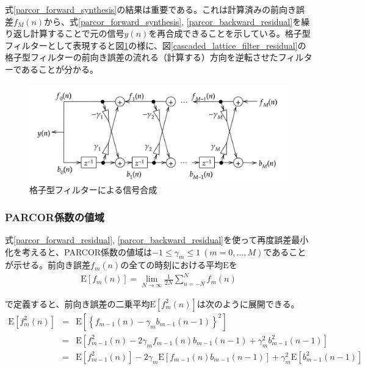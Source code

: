 \documentclass[uplatex,dvipdfmx,b5j,10pt]{jsbook}
\theoremstyle{definition}
\begin{document}
式\ref{parcor_forward_synthesis}の結果は重要である。これは計算済みの前向き誤差$f_{M}(n)$から、式\ref{parcor_forward_synthesis}, \ref{parcor_backward_residual}を繰り返し計算することで元の信号$y(n)$を再合成できることを示している。格子型フィルターとして表現すると図\ref{cascaded_lattice_filter_synthesis}の様に、図\ref{cascaded_lattice_filter_residual}の格子型フィルターの前向き誤差の流れる（計算する）方向を逆転させたフィルターであることが分かる。
\begin{figure}[htbp]
  \begin{center}
    \includegraphics[width=120mm]{./figs/cascaded_lattice_filter_synthesis.png}
    \caption{格子型フィルターによる信号合成} \label{cascaded_lattice_filter_synthesis}
  \end{center}
\end{figure}

\subsubsection{PARCOR係数の値域} \label{range_of_parcor_coef}

式\ref{parcor_forward_residual}, \ref{parcor_backward_residual}を使って再度誤差最小化を考えると、PARCOR係数の値域は$-1 \leq \gamma_{m} \leq 1\ (m=0,\dots,M)$であることが示せる。前向き誤差$f_{m}(n)$の全ての時刻における平均$\textrm{E}$を
\begin{eqnarray*}
  \textrm{E}[f_{m}(n)] = \lim_{N \to \infty}\frac{1}{2N} \sum_{n = -N}^{N} f_{m}(n)
\end{eqnarray*}

で定義すると、前向き誤差の二乗平均$\textrm{E}[f_{m}^{2}(n)]$は次のように展開できる。
\begin{eqnarray*}
  \textrm{E}[f_{m}^{2}(n)] &=& \textrm{E}\left[ \left\{ f_{m-1}(n) - \gamma_{m} b_{m-1}(n - 1) \right\}^{2} \right] \\
  &=& \textrm{E}\left[ f_{m-1}^{2}(n) - 2 \gamma_{m} f_{m-1}(n)b_{m-1}(n - 1) + \gamma_{m}^{2} b_{m-1}^{2}(n - 1) \right] \\
  &=& \textrm{E}\left[ f_{m-1}^{2}(n) \right] - 2 \gamma_{m} \textrm{E}\left[ f_{m-1}(n)b_{m-1}(n - 1) \right] + \gamma_{m}^{2} \textrm{E}\left[ b_{m-1}^{2}(n - 1) \right] 
\end{eqnarray*}
\end{document}
